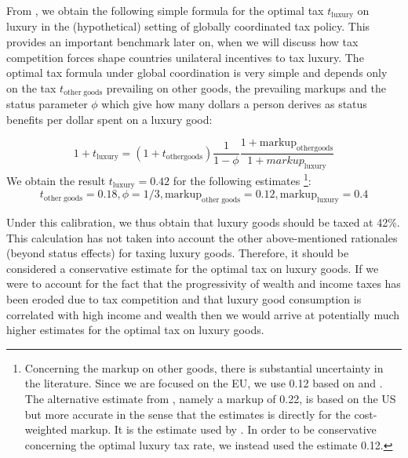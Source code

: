 \documentclass[../../main]{subfiles}
\begin{document}
From \citet{Xie2026}, we obtain the following simple formula for the optimal tax $t_{\mathrm{luxury}}$ on luxury in the (hypothetical) setting of globally coordinated tax policy. This provides an important benchmark later on, when we will discuss how tax competition forces shape countries unilateral incentives to tax luxury. The optimal tax formula under global coordination is very simple and depends only on the tax $t_{\mathrm{other\;goods}}$ prevailing on other goods, the prevailing markups and the status parameter $\phi$ which give how many dollars a person derives as status benefits per dollar spent on a luxury good: 

\[    1+t_{\mathrm{luxury}}=(1+t_{\mathrm{other goods}})\frac{1}{1-\phi}\frac{1+\mathrm{markup}_{\mathrm{other goods}}}{1+markup_{\mathrm{luxury}}}\]
We obtain the result  $t_{\mathrm{luxury}}=0.42$ for the following  estimates \footnote{Concerning the markup on other goods, there is substantial uncertainty in the literature. Since we are focused on the EU, we use 0.12 based on \citet{weche2021fall} and \citet{ganglmair2021markups}. The alternative estimate from \citet{edmond2023cost}, namely a markup of 0.22, is based on the US but more accurate in the sense that the estimates is directly for the cost-weighted markup. It is the estimate used by \citet{Xie2026}. In order to be conservative concerning the optimal luxury tax rate, we instead used the estimate 0.12.}:
\[
t_{\mathrm{other\;goods}}=0.18 ,\phi=1/3
, \mathrm{markup}_{\mathrm{other\;goods}}=0.12,\mathrm{markup}_{\mathrm{luxury}}=0.4\]

Under this calibration, we thus obtain that luxury goods should be taxed at 42\%. This calculation has not taken into account the other above-mentioned rationales (beyond status effects) for taxing luxury goods. Therefore, it should be considered a conservative estimate for the optimal tax on luxury goods. If we were to account for the fact that the progressivity of wealth and income taxes has been eroded due to tax competition and that luxury good consumption is correlated with high income and wealth then we would arrive at potentially much higher estimates for the optimal tax on luxury goods. %

\end{document}
